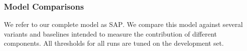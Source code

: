 %
%
%
%


\subsubsection{Model Comparisons}


We refer to our complete model as \textsc{SAP}.  We compare this model
against several variants and baselines intended to measure the contribution of
different components. All thresholds for all runs are tuned on the development
set.


